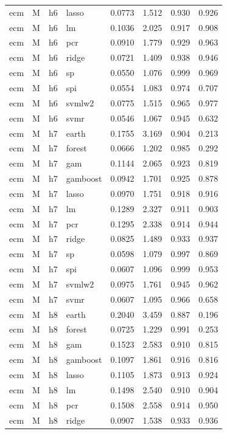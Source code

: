 \begin{ThreePartTable}
\begin{longtable}[t]{llclcccc}
ecm & M & h6 & lasso & 0.0773 & 1.512 & 0.930 & 0.926\\
ecm & M & h6 & lm & 0.1036 & 2.025 & 0.917 & 0.908\\
ecm & M & h6 & pcr & 0.0910 & 1.779 & 0.929 & 0.963\\
ecm & M & h6 & ridge & 0.0721 & 1.409 & 0.938 & 0.946\\
ecm & M & h6 & sp & 0.0550 & 1.076 & 0.999 & 0.969\\
ecm & M & h6 & spi & 0.0554 & 1.083 & 0.974 & 0.707\\
ecm & M & h6 & svmlw2 & 0.0775 & 1.515 & 0.965 & 0.977\\
ecm & M & h6 & svmr & 0.0546 & 1.067 & 0.945 & 0.632\\
\addlinespace
ecm & M & h7 & earth & 0.1755 & 3.169 & 0.904 & 0.213\\
ecm & M & h7 & forest & 0.0666 & 1.202 & 0.985 & 0.292\\
ecm & M & h7 & gam & 0.1144 & 2.065 & 0.923 & 0.819\\
ecm & M & h7 & gamboost & 0.0942 & 1.701 & 0.925 & 0.878\\
ecm & M & h7 & lasso & 0.0970 & 1.751 & 0.918 & 0.916\\
ecm & M & h7 & lm & 0.1289 & 2.327 & 0.911 & 0.903\\
ecm & M & h7 & pcr & 0.1295 & 2.338 & 0.914 & 0.944\\
ecm & M & h7 & ridge & 0.0825 & 1.489 & 0.933 & 0.937\\
ecm & M & h7 & sp & 0.0598 & 1.079 & 0.997 & 0.869\\
ecm & M & h7 & spi & 0.0607 & 1.096 & 0.999 & 0.953\\
ecm & M & h7 & svmlw2 & 0.0975 & 1.761 & 0.945 & 0.962\\
ecm & M & h7 & svmr & 0.0607 & 1.095 & 0.966 & 0.658\\
\addlinespace
ecm & M & h8 & earth & 0.2040 & 3.459 & 0.887 & 0.196\\
ecm & M & h8 & forest & 0.0725 & 1.229 & 0.991 & 0.253\\
ecm & M & h8 & gam & 0.1523 & 2.583 & 0.910 & 0.815\\
ecm & M & h8 & gamboost & 0.1097 & 1.861 & 0.916 & 0.816\\
ecm & M & h8 & lasso & 0.1105 & 1.873 & 0.913 & 0.924\\
ecm & M & h8 & lm & 0.1498 & 2.540 & 0.910 & 0.904\\
ecm & M & h8 & pcr & 0.1508 & 2.558 & 0.914 & 0.950\\
ecm & M & h8 & ridge & 0.0907 & 1.538 & 0.933 & 0.936\\

\end{longtable}
\end{ThreePartTable}
